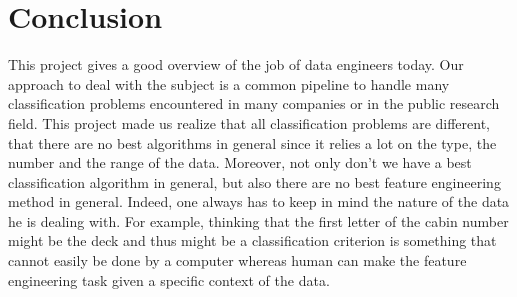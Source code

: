 \documentclass[11pt,a4paper,portrait]{article}
\begin{document}
\part*{Conclusion}
This project gives a good overview of the job of data engineers today. Our approach to deal with the subject is a common pipeline to handle many classification problems encountered in many companies or in the public research field. This project made us realize that all classification problems are different, that there are no best algorithms in general since it relies a lot on the type, the number and the range of the data. Moreover, not only don't we have a best classification algorithm in general, but also there are no best feature engineering method in general. Indeed, one always has to keep in mind the nature of the data he is dealing with. For example, thinking that the first letter of the cabin number might be the deck and thus might be a classification criterion is something that cannot easily be done by a computer whereas human can make the feature engineering task given a specific context of the data.
\end{document}
